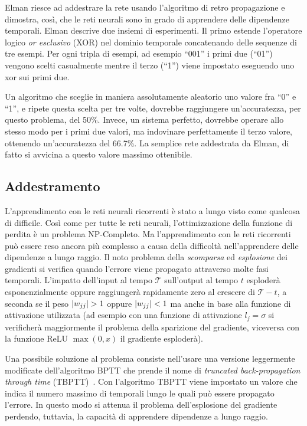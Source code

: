 Elman riesce ad addestrare la rete usando l'algoritmo di retro propagazione e
dimostra, cos\`i, che le reti neurali sono in grado di apprendere delle dipendenze
temporali. Elman descrive due insiemi di esperimenti. Il primo estende l'operatore
logico \emph{or esclusivo} (XOR) nel dominio temporale concatenando delle sequenze
di tre esempi. Per ogni tripla di esempi, ad esempio ``001'' i primi due (``01'')
vengono scelti casualmente mentre il terzo (``1'') viene impostato eseguendo uno
xor sui primi due.

Un algoritmo che sceglie in maniera assolutamente aleatorio uno valore fra ``0''
e ``1'', e ripete questa scelta per tre volte, dovrebbe raggiungere un'accuratezza,
per questo problema, del 50\%. Invece, un sistema perfetto, dovrebbe operare allo
stesso modo per i primi due valori, ma indovinare perfettamente il terzo valore,
ottenendo un'accuratezza del 66.7\%. La semplice rete addestrata da Elman, di fatto
si avvicina a questo valore massimo ottenibile.

\subsection{Addestramento}
L'apprendimento con le reti neurali ricorrenti \`e stato a lungo visto come
qualcosa di difficile. Cos\`i come per tutte le reti neurali, l'ottimizzazione
della funzione di perdita \`e un problema NP-Completo. Ma l'apprendimento con le
reti ricorrenti pu\`o essere reso ancora pi\`u complesso a causa della difficolt\`a
nell'apprendere delle dipendenze a lungo raggio. Il noto problema della
\emph{scomparsa} ed \emph{esplosione} dei gradienti si verifica quando l'errore
viene propagato attraverso molte fasi temporali. L'impatto dell'input al tempo
$\mathcal{T}$ sull'output al tempo $t$ esploder\`a esponenzialmente oppure
raggiunger\`a rapidamente zero al crescere di $\mathcal{T} - t$, a seconda se il
peso $\lvert w_{jj}\rvert>1$ oppure $\lvert w_{jj}\rvert<1$ ma anche in base alla funzione di
attivazione utilizzata (ad esempio con una funzione di attivazione $l_j = \sigma$
si verificher\`a maggiormente il problema della sparizione del gradiente, viceversa
con la funzione ReLU $\operatorname{max}(0, x)$ il gradiente esploder\`a).

Una possibile soluzione al problema consiste nell'usare una versione leggermente
modificate dell'algoritmo BPTT che prende il nome di \emph{truncated back-propagation
through time} (TBPTT)~\cite{Williams:1989}. Con l'algoritmo TBPTT viene impostato
un valore che indica il numero massimo di temporali lungo le quali pu\`o essere
propagato l'errore. In questo modo si attenua il problema dell'esplosione del
gradiente perdendo, tuttavia, la capacit\`a di apprendere dipendenze a lungo raggio.

